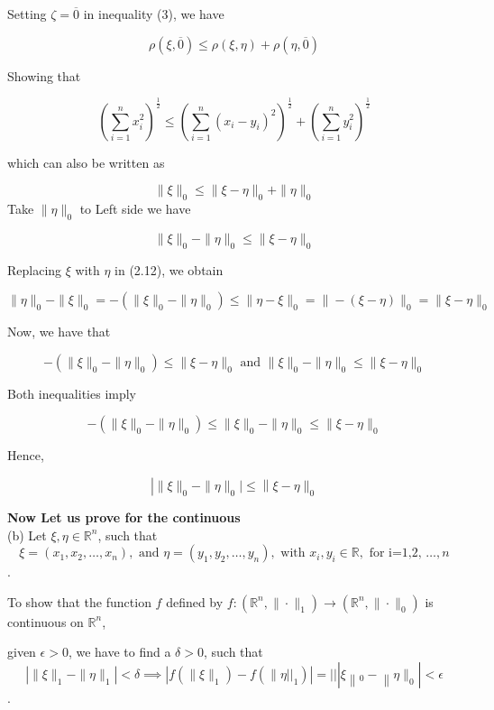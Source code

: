 \documentclass{article}
\begin{document}
Setting $\zeta=\overline{0}$ in inequality (3), we have

$$
\rho(\xi, \overline{0}) \leq \rho(\xi, \eta)+\rho(\eta, \overline{0})
$$

Showing that

$$
\left(\sum_{i=1}^{n} x_{i}^{2}\right)^{\frac{1}{2}} \leq\left(\sum_{i=1}^{n}\left(x_{i}-y_{i}\right)^{2}\right)^{\frac{1}{2}}+\left(\sum_{i=1}^{n} y_{i}^{2}\right)^{\frac{1}{2}}
$$

which can also be written as 

$$
\|\xi\|_{0} \leq\|\xi-\eta\|_{0}+\|\eta\|_{0}
$$
Take $\|\eta\|_{0}$ to Left side we have

$$
\|\xi\|_{0}-\|\eta\|_{0} \leq\|\xi-\eta\|_{0}
$$

Replacing $\xi$ with $\eta$ in (2.12), we obtain

$$
\|\eta\|_{0}-\|\xi\|_{0}=-\left(\|\xi\|_{0}-\|\eta\|_{0}\right) \leq\|\eta-\xi\|_{0}=\|-(\xi-\eta)\|_{0}=\|\xi-\eta\|_{0}
$$

Now, we have that

$$
-\left(\|\xi\|_{0}-\|\eta\|_{0}\right) \leq\|\xi-\eta\|_{0} \text { and }\|\xi\|_{0}-\|\eta\|_{0} \leq\|\xi-\eta\|_{0}
$$

Both inequalities imply

$$
-\left(\|\xi\|_{0}-\|\eta\|_{0}\right) \leq\|\xi\|_{0}-\|\eta\|_{0} \leq\|\xi-\eta\|_{0}
$$

Hence,

$$
\left| \|\xi\|_{0}-\|\eta\|_0 \left|\leq\right\| \xi-\eta \|_{0}\right.
$$



\large{\textbf{Now Let us prove for the continuous}}\\

(b) Let $\xi, \eta \in \mathbb{R}^{n}$, such that \\
$$\xi=\left(x_{1}, x_{2}, \ldots, x_{n}\right),
\text{ and } \eta=\left(y_{1}, y_{2}, \ldots, y_{n}\right), \text{ with } x_i,y_{i} \in \mathbb{R},\text{ for i=1,2, }\ldots, n$$. 

To show that the function $f$ defined by $f:\left(\mathbb{R}^{n},\|\cdot\|_{1}\right) \longrightarrow\left(\mathbb{R}^{n},\|\cdot\|_{0}\right)$ is continuous on $\mathbb{R}^{n}$,

given $\epsilon>0$, we have to find a $\delta>0$, such that 
$$\left|\|\xi\|_{1}-\|\eta\|_{1}\right|<\delta \implies \left|f\left(\|\xi\|_{1}\right)-f\left(\| \eta||_1\right)\right|= ||\left|\xi\left\|_{0}-\right\| \eta \|_{0}\right|<\epsilon$$.
\end{document}
